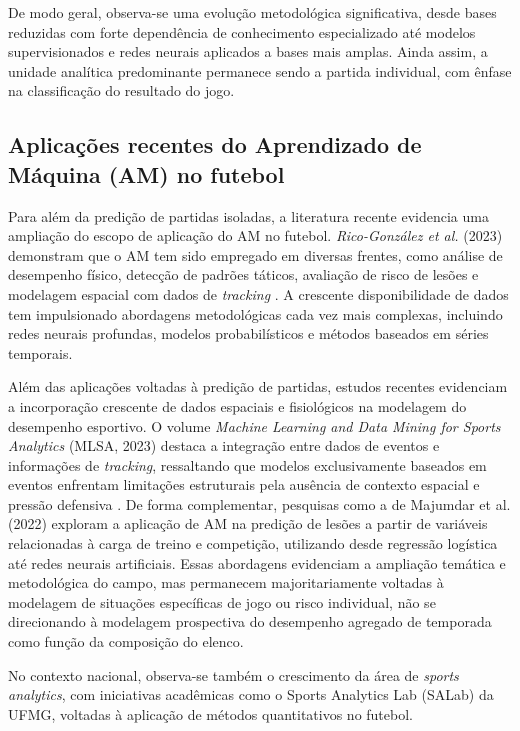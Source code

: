 De modo geral, observa-se uma evolução metodológica significativa, desde bases reduzidas com forte dependência de conhecimento especializado 
até modelos supervisionados e redes neurais aplicados a bases mais amplas. Ainda assim, a unidade analítica predominante permanece sendo a partida individual, 
com ênfase na classificação do resultado do jogo.

\subsection{Aplicações recentes do Aprendizado de Máquina (AM) no futebol}

Para além da predição de partidas isoladas, a literatura recente evidencia uma ampliação do escopo de aplicação do AM no futebol. 
\textit{Rico-González et al.} (2023) demonstram que o AM tem sido empregado em diversas frentes, como análise de desempenho físico, 
detecção de padrões táticos, avaliação de risco de lesões e modelagem espacial com dados de \textit{tracking} \cite{Rico2023}. 
A crescente disponibilidade de dados tem impulsionado abordagens metodológicas cada vez mais complexas, incluindo redes neurais profundas, 
modelos probabilísticos e métodos baseados em séries temporais.

Além das aplicações voltadas à predição de partidas, estudos recentes evidenciam a incorporação crescente de dados espaciais e fisiológicos na 
modelagem do desempenho esportivo. O volume \textit{Machine Learning and Data Mining for Sports Analytics} (MLSA, 2023) destaca a integração entre 
dados de eventos e informações de \textit{tracking}, ressaltando que modelos exclusivamente baseados em eventos enfrentam limitações estruturais pela ausência 
de contexto espacial e pressão defensiva \cite{MLSA2023}. De forma complementar, pesquisas como a de Majumdar et al. (2022) exploram a aplicação de AM na predição de 
lesões a partir de variáveis relacionadas à carga de treino e competição, utilizando desde regressão logística até redes neurais artificiais. Essas abordagens 
evidenciam a ampliação temática e metodológica do campo, mas permanecem majoritariamente voltadas à modelagem de situações específicas de jogo ou risco individual, 
não se direcionando à modelagem prospectiva do desempenho agregado de temporada como função da composição do elenco.

No contexto nacional, observa-se também o crescimento da área de \textit{sports analytics}, com iniciativas acadêmicas como o Sports Analytics Lab (SALab) da UFMG, 
voltadas à aplicação de métodos quantitativos no futebol.

